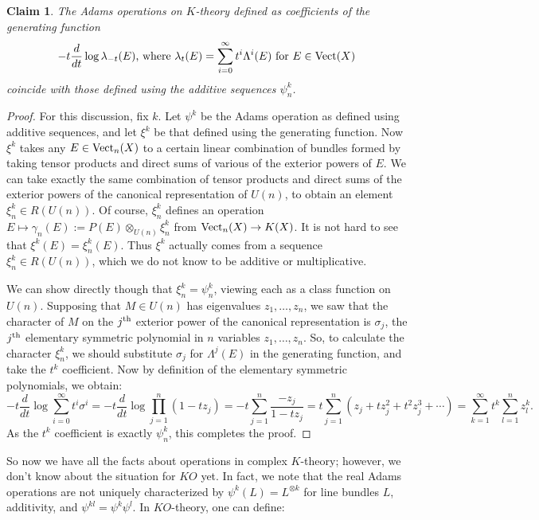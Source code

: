 \documentclass{article}
\newcommand{\Vect}{\textup{Vect}}
\newtheorem{claim}[thm]{Claim}
\begin{document}
\begin{claim}
The Adams operations on $K$-theory defined as coefficients of the generating function
\[-t \frac{d}{dt}\log \lambda_{-t}(E)\textup{, where }\lambda_t(E)=\sum_{i=0}^\infty t^i\Lambda^i(E)\text{ for } E\in\Vect(X)\]
coincide with those defined using the additive sequences $\psi^k_n$.
\end{claim}
\begin{proof}
For this discussion, fix $k$. Let $\psi^k$ be the Adams operation as defined using additive sequences, and let $\xi^k$ be that defined using the generating function. Now $\xi^k$ takes any $E\in\Vect_n(X)$ to a certain linear combination of bundles formed by taking tensor products and direct sums of various of the exterior powers of $E$. We can take exactly the same combination of tensor products and direct sums of the exterior powers of the canonical representation of $U(n)$, to obtain an element $\xi^k_n\in R(U(n))$. Of course, $\xi^k_n$ defines an operation $E\mapsto \gamma_n(E):=P(E)\otimes_{U(n)}\xi^k_n$ from $\Vect_n(X)\to K(X)$. It is not hard to see that $\xi^k(E)=\xi^k_n(E)$. Thus $\xi^k$ actually comes from a sequence $\xi^k_n\in R(U(n))$, which we do not know to be additive or multiplicative.

We can show directly though that $\xi^k_n=\psi^k_n$, viewing each as a class function on $U(n)$. Supposing that $M\in U(n)$ has eigenvalues $z_1,\ldots,z_n$, we saw that the character of $M$ on the $j^\textup{th}$ exterior power of the canonical representation is $\sigma_j$, the $j^\textup{th}$ elementary symmetric polynomial in $n$ variables $z_1,\ldots,z_n$. So, to calculate the character $\xi^k_n$, we should substitute $\sigma_j$ for $\Lambda^j(E)$ in the generating function, and take the $t^k$ coefficient.
Now by definition of the elementary symmetric polynomials, we obtain:
\[-t\frac{d}{dt}\log\sum_{i=0}^\infty t^i\sigma^i
=-t\frac{d}{dt}\log\prod_{j=1}^n(1-t z_j)=-t\sum_{j=1}^n\frac{-z_j}{1-tz_j}=t\sum_{j=1}^n \left(z_j+tz_j^2+t^2z_j^3+\cdots\right)=\sum_{k=1}^\infty t^k \sum_{l=1}^nz_l^k.\]
As the $t^k$ coefficient is exactly $\psi^k_n$, this completes the proof.
\end{proof}
So now we have all the facts about operations in complex $K$-theory; however, we don't know about the situation for $KO$ yet.  In fact, we note that the real Adams operations are not uniquely characterized by $\psi^k(L) = L^{\otimes k}$ for line bundles $L$, additivity, and $\psi^{kl} = \psi^k \psi^l$.  In $KO$-theory, one can define:
\end{document}
